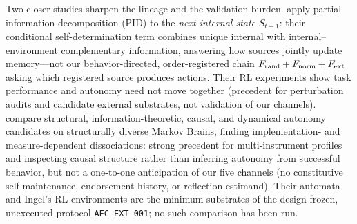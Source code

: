 Two closer studies sharpen the lineage and the validation burden.
\citet{ingel2022quantifying} apply partial information decomposition (PID) to
the \emph{next internal state} $S_{t+1}$: their conditional self-determination
term combines unique internal with internal--environment complementary
information, answering how sources jointly update memory---not our
behavior-directed, order-registered chain $F_{\mathrm{rand}}+F_{\mathrm{norm}}+F_{\mathrm{ext}}$ asking which
registered source produces actions. Their RL experiments show task
performance and autonomy need not move together (precedent for perturbation
audits and candidate external substrates, not validation of our channels).
\citet{albantakis2021quantifying} compare structural, information-theoretic,
causal, and dynamical autonomy candidates on structurally diverse Markov
Brains, finding implementation- and measure-dependent dissociations: strong
precedent for multi-instrument profiles and inspecting causal structure
rather than inferring autonomy from successful behavior, but not a one-to-one
anticipation of our five channels (no constitutive self-maintenance,
endorsement history, or reflection estimand). Their automata and Ingel's RL
environments are the minimum substrates of the design-frozen, unexecuted
protocol \texttt{AFC-EXT-001}; no such comparison has been run.

